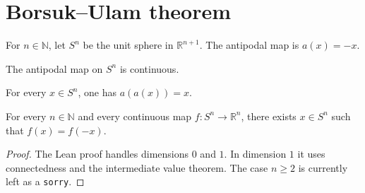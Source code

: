 \section{Borsuk--Ulam theorem}

\begin{definition}
\label{def:borsuk-ulam-antipode}
\leanok
For $n\in\mathbb N$, let $S^n$ be the unit sphere in $\mathbb R^{n+1}$. The antipodal map is $a(x)=-x$.
\end{definition}

\begin{lemma}
\label{lem:borsuk-ulam-continuous-antipode}
\leanok
{}
The antipodal map on $S^n$ is continuous.
\end{lemma}

\begin{lemma}
\label{lem:borsuk-ulam-antipode-involution}
\leanok
{}
For every $x\in S^n$, one has $a(a(x))=x$.
\end{lemma}

\begin{theorem}
\label{thm:borsuk-ulam}
\notready
{}
For every $n\in\mathbb N$ and every continuous map $f:S^n\to\mathbb R^n$, there exists $x\in S^n$ such that $f(x)=f(-x)$.
\end{theorem}

\begin{proof}
The Lean proof handles dimensions $0$ and $1$. In dimension $1$ it uses connectedness and the intermediate value theorem. The case $n\ge 2$ is currently left as a \texttt{sorry}.
\end{proof}
